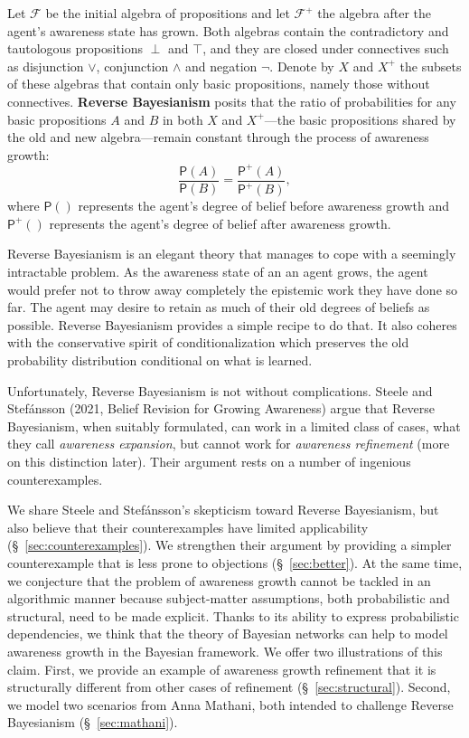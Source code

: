 \documentclass[
  11pt,
  dvipsnames,enabledeprecatedfontcommands]{scrartcl}
\newcommand{\pr}[1]{\ensuremath{\mathsf{P}(#1)}}
\newcommand{\ppr}[2]{\ensuremath{\mathsf{P}^{#1}(#2)}}
\begin{document}
Let \(\mathcal{F}\) be the initial algebra of propositions and let
\(\mathcal{F}^+\) the algebra after the agent's awareness state has
grown. Both algebras contain the contradictory and tautologous
propositions \(\perp\) and \(\top\), and they are closed under
connectives such as disjunction \(\vee\), conjunction \(\wedge\) and
negation \(\neg\). Denote by \(X\) and \(X^+\) the subsets of these
algebras that contain only basic propositions, namely those without
connectives. \textbf{Reverse Bayesianism} posits that the ratio of
probabilities for any basic propositions \(A\) and \(B\) in both \(X\)
and \(X^+\)---the basic propositions shared by the old and new
algebra---remain constant through the process of awareness growth:
\[\frac{\pr{A}}{\pr{B}} = \frac{\ppr{+}{A}}{\ppr{+}{B}},\] where
\(\pr{}\) represents the agent's degree of belief before awareness
growth and \(\ppr{+}{}\) represents the agent's degree of belief after
awareness growth.

Reverse Bayesianism is an elegant theory that manages to cope with a
seemingly intractable problem. As the awareness state of an an agent
grows, the agent would prefer not to throw away completely the epistemic
work they have done so far. The agent may desire to retain as much of
their old degrees of beliefs as possible. Reverse Bayesianism provides a
simple recipe to do that. It also coheres with the conservative spirit
of conditionalization which preserves the old probability distribution
conditional on what is learned.

Unfortunately, Reverse Bayesianism is not without complications. Steele
and Stefánsson (2021, Belief Revision for Growing Awareness) argue that
Reverse Bayesianism, when suitably formulated, can work in a limited
class of cases, what they call \textit{awareness expansion}, but cannot
work for \textit{awareness refinement} (more on this distinction later).
Their argument rests on a number of ingenious counterexamples.

We share Steele and Stefánsson's skepticism toward Reverse Bayesianism,
but also believe that their counterexamples have limited applicability
(\S ~\ref{sec:counterexamples}). We strengthen their argument by
providing a simpler counterexample that is less prone to objections
(\S ~\ref{sec:better}). At the same time, we conjecture that the problem
of awareness growth cannot be tackled in an algorithmic manner because
subject-matter assumptions, both probabilistic and structural, need to
be made explicit. Thanks to its ability to express probabilistic
dependencies, we think that the theory of Bayesian networks can help to
model awareness growth in the Bayesian framework. We offer two
illustrations of this claim. First, we provide an example of awareness
growth refinement that it is structurally different from other cases of
refinement (\S ~\ref{sec:structural}). Second, we model two scenarios
from Anna Mathani, both intended to challenge Reverse Bayesianism
(\S ~\ref{sec:mathani}).
\end{document}
